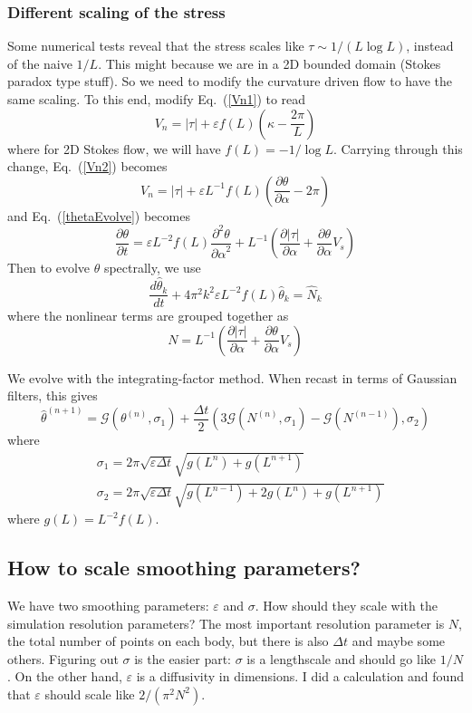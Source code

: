 \documentclass[11pt]{article}
\newcommand{\pd}[2]    { \frac{\partial #1} {\partial #2} }
\newcommand{\ppd}[2]  { \frac{\partial^2 #1}{{\partial #2}^2} }
\newcommand{\td}[2] { \frac{d #1} { d #2 } }
\newcommand{\abs}[1]{\left| #1 \right|}
\newcommand{\eps}{\varepsilon}
\newcommand{\atau}{\abs{\tau}}
\newcommand{\thh}{\hat{\theta}}
\newcommand{\GG}{\mathcal{G}}
\newcommand{\Dt}{\Delta t}
\begin{document}
\subsubsection{Different scaling of the stress}
Some numerical tests reveal that the stress scales like $\tau \sim 1/(L \log L)$, instead of the naive $1/L$. This might because we are in a 2D bounded domain (Stokes paradox type stuff). So we need to modify the curvature driven flow to have the same scaling. To this end, modify Eq.~(\ref{Vn1}) to read
\begin{equation}
V_n = \atau + \eps f(L) \left(\kappa - \frac{2 \pi}{L} \right)
\end{equation}
where for 2D Stokes flow, we will have $f(L) = -1/\log L$. Carrying through this change, Eq.~(\ref{Vn2}) becomes
\begin{equation}
V_n = \atau + \eps L^{-1} f(L) \left(\pd{\theta}{\alpha} - 2 \pi \right)
\end{equation}
and Eq.~(\ref{thetaEvolve}) becomes
\begin{equation}
\pd{\theta}{t} = \eps L^{-2} f(L) \ppd{\theta}{\alpha} + L^{-1} \left( \pd{\atau}{\alpha} + \pd{\theta}{\alpha} V_s \right)
\end{equation}
Then to evolve $\theta$ spectrally, we use
\begin{equation}
\td{\thh_k}{t} + 4 \pi^2 k^2 \eps L^{-2} f(L)  \thh_k = \hat{N}_k
\end{equation}
where the nonlinear terms are grouped together as
\begin{equation}
N = L^{-1} \left( \pd{\atau}{\alpha} + \pd{\theta}{\alpha} V_s \right)
\end{equation}

We evolve with the integrating-factor method. When recast in terms of Gaussian filters, this gives
\begin{equation}
\label{intfact}
\thh^{(n+1)} = \GG(\theta^{(n)}, \sigma_1) 
+ \frac{\Dt}{2} \left( 3 \GG(N^{(n)}, \sigma_1) - \GG(N^{(n-1)}), \sigma_2 \right)
\end{equation}
where
\begin{align}
& \sigma_1 = 2 \pi \sqrt{\eps \Dt} \sqrt{g(L^{n}) + g(L^{n+1}) } 	\\
& \sigma_2 = 2 \pi \sqrt{\eps \Dt} \sqrt{g(L^{n-1}) + 2 g(L^{n}) + g(L^{n+1}) }
\end{align}
where $g(L) = L^{-2} f(L)$.




\subsection{How to scale smoothing parameters?}
We have two smoothing parameters: $\eps$ and $\sigma$. How should they scale with the simulation resolution parameters? The most important resolution parameter is $N$, the total number of points on each body, but there is also $\Delta t$ and maybe some others. Figuring out $\sigma$ is the easier part: $\sigma$ is a lengthscale and should go like $1/N$. On the other hand, $\eps$ is a diffusivity in dimensions. I did a calculation and found that $\eps$ should scale like $2/(\pi^2 N^2)$.
\end{document}
